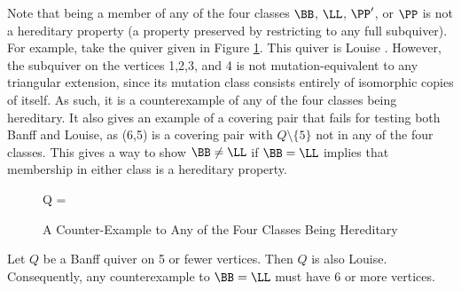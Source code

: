 \begin{rema}
Note that being a member of any of the four classes $\BB$, $\LL$, $\PP'$, or $\PP$ is not a hereditary property (a property preserved by restricting to any full subquiver).
For example, take the quiver given in Figure \ref{fig-counter-example}.
This quiver is Louise \cite[Remark 11.15]{MR2995670}.
However, the subquiver on the vertices 1,2,3, and 4 is not mutation-equivalent to any triangular extension, since its mutation class consists entirely of isomorphic copies of itself.
As such, it is a counterexample of any of the four classes being hereditary.  
It also gives an example of a covering pair that fails for testing both Banff and Louise, as (6,5) is a covering pair with $Q \setminus \{5\}$ not in any of the four classes.
This gives a way to show $\BB \neq \LL$ if $\BB = \LL$ implies that membership in either class is a hereditary property.

\begin{figure}[ht]
    \centering
    Q =
    \caption{A Counter-Example to Any of the Four Classes Being Hereditary}
    \label{fig-counter-example}
\end{figure}
\end{rema}

\begin{prop}\label{prop-size-counterexample}
Let $Q$ be a Banff quiver on 5 or fewer vertices.
Then $Q$ is also Louise.
Consequently, any counterexample to $\BB = \LL$ must have 6 or more vertices.
\end{prop}

